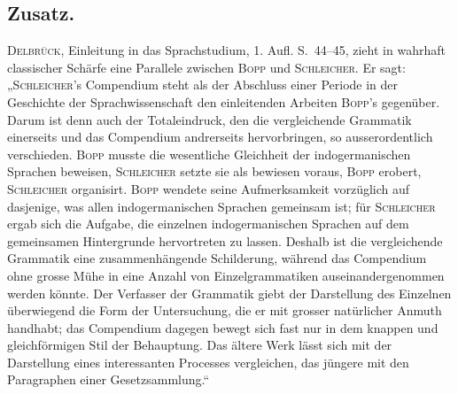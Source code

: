 {\begin{styleAnmerk}
\end{styleAnmerk}

\subsection*{Zusatz.}\label{III.II.zusatz}
\textsc{Delbrück}, Einleitung in das Sprachstudium, 1. Aufl. S.~44–45, zieht in wahrhaft classischer Schärfe eine Parallele zwischen \textsc{Bopp} und \textsc{Schleicher}. Er sagt: „\textsc{Schleicher}’s Compendium steht als der Abschluss einer Periode in der \label{sp.172} Geschichte der Sprachwissenschaft den einleitenden Arbeiten \textsc{Bopp}’s gegenüber. Darum ist denn auch der Totaleindruck, den die vergleichende Grammatik einerseits und das Compendium andrerseits hervorbringen, so ausserordentlich verschieden. \textsc{Bopp} musste die wesentliche Gleichheit der indogermanischen Sprachen beweisen, \textsc{Schleicher} setzte sie als bewiesen voraus, \textsc{Bopp} erobert, \textsc{Schleicher} organisirt. \textsc{Bopp} wendete seine Aufmerksamkeit vorzüglich auf dasjenige, was allen indogermanischen Sprachen gemeinsam ist; für \textsc{Schleicher} ergab sich die Aufgabe, die einzelnen indogermanischen Sprachen auf dem gemeinsamen Hintergrunde hervortreten zu lassen. Deshalb ist die vergleichende Grammatik eine zusammenhängende Schilderung, während das Compendium ohne grosse Mühe in eine Anzahl von Einzelgrammatiken auseinandergenommen werden könnte. Der Verfasser der Grammatik giebt der Darstellung des Einzelnen überwiegend die Form der Untersuchung, die er mit grosser natürlicher Anmuth handhabt; das Compendium dagegen bewegt sich fast nur in dem knappen und gleichförmigen Stil der Behauptung. Das ältere Werk lässt sich mit der Darstellung eines interessanten Processes vergleichen, das jüngere mit den Paragraphen einer Gesetzsammlung.“ 

}
